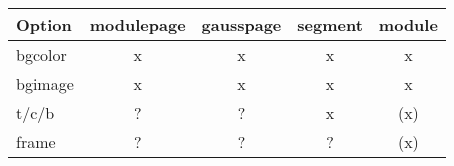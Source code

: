 \documentclass[a4paper,10pt]{tubsartcl}
\begin{document}
\newcommand\yes{x}
\newcommand\no{--}
\newcommand\tbd{(x)}%
\newcommand\un{?}%

\begin{tabular}{@{\,\ttfamily}lcccc}
  \bfseries Option & \bfseries modulepage & \bfseries gausspage & \bfseries segment & \bfseries module\\
  \midrule
  bgcolor & \yes & \yes & \yes & \yes\\
  bgimage & \yes & \yes & \yes & \yes\\
  t/c/b   & \un  & \un  & \yes & \tbd\\
  frame   & \un  & \un  & \un  & \tbd\\
\end{tabular}
\end{document}
